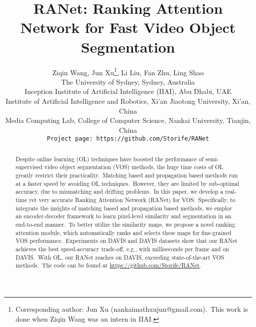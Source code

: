\documentclass[10pt,twocolumn,letterpaper]{article}
\begin{document}
\title{RANet: Ranking Attention Network for Fast Video Object Segmentation}

\author{Ziqin Wang, Jun Xu\thanks{Corresponding author: Jun Xu (nankaimathxujun@gmail.com).\ This work is done when Ziqin Wang was an intern in IIAI.}, Li Liu, Fan Zhu, Ling Shao\\
The University of Sydney, Sydney, Australia\\
Inception Institute of Artificial Intelligence (IIAI), Abu Dhabi, UAE\\
Institute of Artificial Intelligence and Robotics, Xi'an Jiaotong University, Xi'an, China\\
Media Computing Lab, College of Computer Science, Nankai University, Tianjin, China\\
{\tt\small Project page:\ https://github.com/Storife/RANet}
}








\maketitle
\thispagestyle{empty}
\pagestyle{empty}


\begin{abstract}
Despite online learning (OL) techniques have boosted the performance of semi-supervised video object segmentation (VOS) methods, the huge time costs of OL greatly restrict their practicality.\ Matching based and propagation based methods run at a faster speed by avoiding OL techniques.\ However, they are limited by sub-optimal accuracy, due to mismatching and drifting problems.\ In this paper, we develop a real-time yet very accurate Ranking Attention Network (RANet) for VOS.\ Specifically, to integrate the insights of matching based and propagation based methods, we employ an encoder-decoder framework to learn pixel-level similarity and segmentation in an end-to-end manner.\ To better utilize the similarity maps, we propose a novel ranking attention module, which automatically ranks and selects these maps for fine-grained VOS performance.\ Experiments on DAVIS and DAVIS datasets show that our RANet achieves the best speed-accuracy trade-off, e.g., with  milliseconds per frame and  on DAVIS.\ With OL, our RANet reaches  on DAVIS, exceeding state-of-the-art VOS methods.\ The code can be found at \url{https://github.com/Storife/RANet}.
\end{abstract}

\vspace{-2mm}
\end{document}
